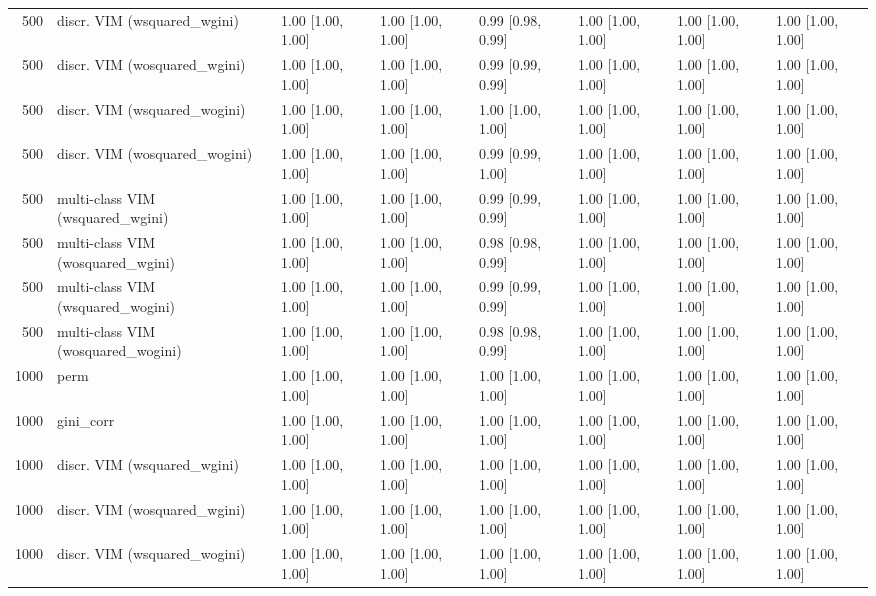 \begin{table}[ht]
\begin{tabular}{rlllllll}
  500 & discr. VIM (wsquared\_wgini) & 1.00 [1.00, 1.00] & 1.00 [1.00, 1.00] & 0.99 [0.98, 0.99] & 1.00 [1.00, 1.00] & 1.00 [1.00, 1.00] & 1.00 [1.00, 1.00] \\ 
  500 & discr. VIM (wosquared\_wgini) & 1.00 [1.00, 1.00] & 1.00 [1.00, 1.00] & 0.99 [0.99, 0.99] & 1.00 [1.00, 1.00] & 1.00 [1.00, 1.00] & 1.00 [1.00, 1.00] \\ 
  500 & discr. VIM (wsquared\_wogini) & 1.00 [1.00, 1.00] & 1.00 [1.00, 1.00] & 1.00 [1.00, 1.00] & 1.00 [1.00, 1.00] & 1.00 [1.00, 1.00] & 1.00 [1.00, 1.00] \\ 
  500 & discr. VIM (wosquared\_wogini) & 1.00 [1.00, 1.00] & 1.00 [1.00, 1.00] & 0.99 [0.99, 1.00] & 1.00 [1.00, 1.00] & 1.00 [1.00, 1.00] & 1.00 [1.00, 1.00] \\ 
  500 & multi-class VIM (wsquared\_wgini) & 1.00 [1.00, 1.00] & 1.00 [1.00, 1.00] & 0.99 [0.99, 0.99] & 1.00 [1.00, 1.00] & 1.00 [1.00, 1.00] & 1.00 [1.00, 1.00] \\ 
  500 & multi-class VIM (wosquared\_wgini) & 1.00 [1.00, 1.00] & 1.00 [1.00, 1.00] & 0.98 [0.98, 0.99] & 1.00 [1.00, 1.00] & 1.00 [1.00, 1.00] & 1.00 [1.00, 1.00] \\ 
  500 & multi-class VIM (wsquared\_wogini) & 1.00 [1.00, 1.00] & 1.00 [1.00, 1.00] & 0.99 [0.99, 0.99] & 1.00 [1.00, 1.00] & 1.00 [1.00, 1.00] & 1.00 [1.00, 1.00] \\ 
  500 & multi-class VIM (wosquared\_wogini) & 1.00 [1.00, 1.00] & 1.00 [1.00, 1.00] & 0.98 [0.98, 0.99] & 1.00 [1.00, 1.00] & 1.00 [1.00, 1.00] & 1.00 [1.00, 1.00] \\ 
   \hline 1000 & perm & 1.00 [1.00, 1.00] & 1.00 [1.00, 1.00] & 1.00 [1.00, 1.00] & 1.00 [1.00, 1.00] & 1.00 [1.00, 1.00] & 1.00 [1.00, 1.00] \\ 
  1000 & gini\_corr & 1.00 [1.00, 1.00] & 1.00 [1.00, 1.00] & 1.00 [1.00, 1.00] & 1.00 [1.00, 1.00] & 1.00 [1.00, 1.00] & 1.00 [1.00, 1.00] \\ 
  1000 & discr. VIM (wsquared\_wgini) & 1.00 [1.00, 1.00] & 1.00 [1.00, 1.00] & 1.00 [1.00, 1.00] & 1.00 [1.00, 1.00] & 1.00 [1.00, 1.00] & 1.00 [1.00, 1.00] \\ 
  1000 & discr. VIM (wosquared\_wgini) & 1.00 [1.00, 1.00] & 1.00 [1.00, 1.00] & 1.00 [1.00, 1.00] & 1.00 [1.00, 1.00] & 1.00 [1.00, 1.00] & 1.00 [1.00, 1.00] \\ 
  1000 & discr. VIM (wsquared\_wogini) & 1.00 [1.00, 1.00] & 1.00 [1.00, 1.00] & 1.00 [1.00, 1.00] & 1.00 [1.00, 1.00] & 1.00 [1.00, 1.00] & 1.00 [1.00, 1.00] \\ 

\end{tabular}
\end{table}

